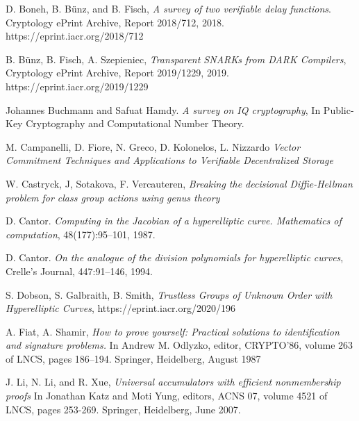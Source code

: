 \documentclass[11pt, lettersize, notitlepage, leqno, footskip=0.6cm]{article}
\newcommand{\noin}{\noindent}
\numberwithin{equation}{section}
\begin{document}
\noin [BBF18] D. Boneh, B. B\"{u}nz, and B. Fisch, \textit{A survey of two verifiable delay functions}. Cryptology ePrint Archive, Report 2018/712, 2018. https://eprint.iacr.org/2018/712 \vspace{0.1cm}

\noindent [BFS19] B. B\"{u}nz, B. Fisch, A. Szepieniec, \textit{Transparent SNARKs from DARK Compilers}, Cryptology ePrint Archive, Report 2019/1229, 2019. https://eprint.iacr.org/2019/1229 \vspace{0.1cm}

\noin [BH01] Johannes Buchmann and Safuat Hamdy. \textit{A survey on IQ cryptography}, In Public-Key Cryptography and Computational Number Theory. \vspace{0.1cm}

\noindent [CFGKN20] M. Campanelli, D. Fiore, N. Greco, D. Kolonelos, L. Nizzardo \textit{Vector Commitment Techniques and Applications to Verifiable Decentralized Storage} \vspace{0.1cm}

\noin [CSV20] W. Castryck, J, Sotakova, F. Vercauteren, \textit{Breaking the decisional Diffie-Hellman problem for class group actions using genus theory}\vspace{0.1cm}

\noindent [Can87] D. Cantor. \textit{Computing in the Jacobian of a hyperelliptic curve. Mathematics of computation}, 48(177):95–101, 1987.\vspace{0.1cm}

\noindent [Can94] D. Cantor. \textit{On the analogue of the division polynomials for hyperelliptic curves}, Crelle's Journal, 447:91–146, 1994.\vspace{0.1cm}


\noindent [DGS20] S. Dobson, S. Galbraith, B. Smith, \textit{Trustless Groups of Unknown Order with Hyperelliptic Curves}, https://eprint.iacr.org/2020/196\vspace{0.1cm}

\noindent [FS87] A. Fiat, A. Shamir, \textit{How to prove yourself: Practical solutions to identification and signature problems.} In Andrew M. Odlyzko, editor, CRYPTO’86, volume 263 of LNCS, pages 186–194. Springer, Heidelberg, August 1987\vspace{0.1cm}

\noin [LLX07] J. Li, N. Li, and R. Xue,  \textit{Universal accumulators with efficient nonmembership proofs} In Jonathan Katz and Moti Yung, editors, ACNS 07, volume 4521 of LNCS, pages 253-269. Springer, Heidelberg, June 2007.
\end{document}
